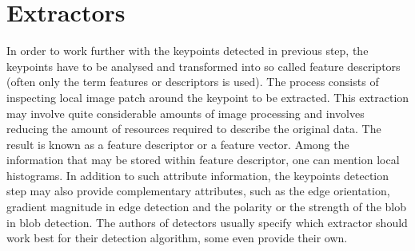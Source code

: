 \section{Extractors}
\label{sec:extractors}
In order to work further with the keypoints detected in previous step, the keypoints have to be analysed and transformed into so called feature descriptors (often only the term features or descriptors is used). The process consists of inspecting local image patch around the keypoint to be extracted. This extraction may involve quite considerable amounts of image processing and involves reducing the amount of resources required to describe the original data. The result is known as a feature descriptor or a feature vector. Among the information that may be stored within feature descriptor, one can mention local histograms. In addition to such attribute information, the keypoints detection step may also provide complementary attributes, such as the edge orientation, gradient magnitude in edge detection and the polarity or the strength of the blob in blob detection. The authors of detectors usually specify which extractor should work best for their detection algorithm, some even provide their own.

